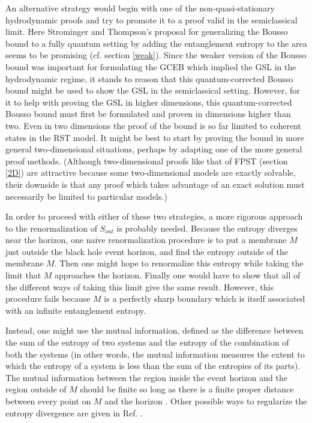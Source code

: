 \documentclass[12pt]{article}
\begin{document}
An alternative strategy would begin with one of the non-quasi-stationary hydrodynamic proofs and try to promote it to a proof valid in the semiclassical limit.  Here Strominger and Thompson's proposal \cite{ST04} for generalizing the Bousso bound to a fully quantum setting by adding the entanglement entropy to the area seems to be promising (cf. section \ref{weak}).  Since the weaker version of the Bousso bound was important for formulating the GCEB which implied the GSL in the hydrodynamic regime, it stands to reason that this quantum-corrected Bousso bound might be used to show the GSL in the semiclassical setting.  However, for it to help with proving the GSL in higher dimensions, this quantum-corrected Bousso bound must first be formulated and proven in dimensions higher than two.  Even in two dimensions the proof of the bound is so far limited to coherent states in the RST model.  It might be best to start by proving the bound in more general two-dimensional situations, perhaps by adapting one of the more general proof methods.  (Although two-dimensional proofs like that of FPST \cite{fiola94} (section \ref{2D}) are attractive because some two-dimensional models are exactly solvable, their downside is that any proof which takes advantage of an exact solution must necessarily be limited to particular models.)

In order to proceed with either of these two strategies, a more rigorous approach to the renormalization of $S_{out}$ is probably needed.  Because the entropy diverges near the horizon, one naive renormalization procedure is to put a membrane $M$ just outside the black hole event horizon, and find the entropy outside of the membrane $M$.  Then one might hope to renormalize this entropy while taking the limit that $M$ approaches the horizon.  Finally one would have to show that all of the different ways of taking this limit give the same result.  However, this procedure fails because $M$ is a perfectly sharp boundary which is itself associated with an infinite entanglement entropy.

Instead, one might use the mutual information, defined as the difference between the sum of the entropy of two systems and the entropy of the combination of both the systems (in other words, the mutual information measures the extent to which the entropy of a system is less than the sum of the entropies of its parts).  The mutual information between the region inside the event horizon and the region outside of $M$ should be finite so long as there is a finite proper distance between every point on $M$ and the horizon \cite{CM04}.  Other possible ways to regularize the entropy divergence are given in Ref. \cite{BKLS86}.
\end{document}
